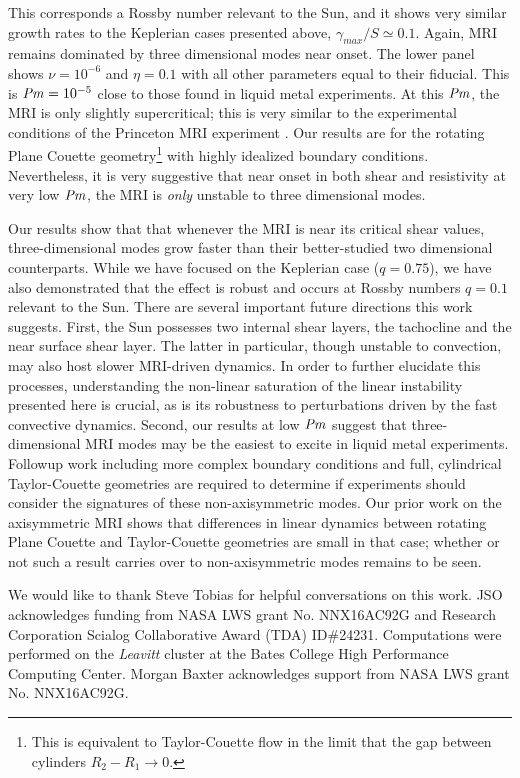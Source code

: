\documentclass[aps,prl,reprint,superscriptaddress]{revtex4-1}
\newcommand{\Prm}{\mbox{\textit{Pm}}}
\begin{document}
This corresponds a Rossby number relevant to the Sun, and it shows very similar growth rates to the Keplerian cases presented above, $\gamma_{max}/S \simeq 0.1$.
Again, MRI remains dominated by three dimensional modes near onset.
The lower panel shows $\nu = 10^{-6}$ and $\eta = 0.1$ with all other parameters equal to their fiducial. 
This is $\Prm = 10^{-5}$ close to those found in liquid metal experiments.
At this $\Prm$, the MRI is only slightly supercritical; this is very similar to the experimental conditions of the Princeton MRI experiment \citep{2002JFM...462..365G}.
Our results are for the rotating Plane Couette geometry\footnote{This is equivalent to Taylor-Couette flow in the limit that the gap between cylinders $R_2 - R_1 \to 0$.} with highly idealized boundary conditions.
Nevertheless, it is very suggestive that near onset in both shear and resistivity at very low $\Prm$, the MRI is \emph{only} unstable to three dimensional modes.

Our results show that that whenever the MRI is near its critical shear values,  three-dimensional modes grow faster than their better-studied two dimensional counterparts.
While we have focused on the Keplerian case ($q=0.75$), we have also demonstrated that the effect is robust and occurs at Rossby numbers $q=0.1$ relevant to the Sun.
There are several important future directions this work suggests.
First, the Sun possesses two internal shear layers, the tachocline and the near surface shear layer.
The latter in particular, though unstable to convection, may also host slower MRI-driven dynamics.
In order to further elucidate this processes, understanding the non-linear saturation of the linear instability presented here is crucial, as is its robustness to perturbations driven by the fast convective dynamics.
Second, our results at low $\Prm$ suggest that three-dimensional MRI modes may be the easiest to excite in liquid metal experiments.
Followup work including more complex boundary conditions and full, cylindrical Taylor-Couette geometries are required to determine if experiments should consider the signatures of these non-axisymmetric modes.
Our prior work on the axisymmetric MRI \citep{2017ApJ...841....1C,2017ApJ...841....2C} shows that differences in linear dynamics between rotating Plane Couette and Taylor-Couette geometries are small in that case; whether or not such a result carries over to non-axisymmetric modes remains to be seen.


\begin{acknowledgments}
We would like to thank Steve Tobias for helpful conversations on this work.
JSO acknowledges funding from NASA LWS grant No. NNX16AC92G and Research Corporation Scialog Collaborative Award (TDA) ID\#24231. Computations were performed on the \emph{Leavitt} cluster at the Bates College High Performance Computing Center.
Morgan Baxter acknowledges support from NASA LWS grant No. NNX16AC92G.
\end{acknowledgments}


\end{document}
